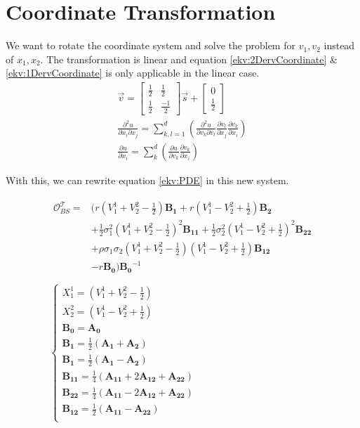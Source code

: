 \documentclass[a4paper]{article}      %
\begin{document}
\section*{Coordinate Transformation}
We want to rotate the coordinate system and solve the problem for $v_1, v_2$ instead of  $x_1, x_2$. The transformation is linear and equation \ref{ekv:2DervCoordinate} \& \ref{ekv:1DervCoordinate} is only applicable in the linear case. 
\begin{gather}
\vec{v} =
\begin{bmatrix}
\frac{1}{2} & \frac{1}{2} \\ \frac{1}{2} & \frac{-1}{2}
\end{bmatrix}
\vec{s} +
\begin{bmatrix}
0 \\ \frac{1}{2}
\end{bmatrix} \\
\frac{\partial^2 u}{\partial {x_i}\partial {x_j}} =
\sum_{k,l = 1}^d 
\left( 
\frac{\partial^2 u}{\partial {v_k}\partial {v_l}}
\frac{\partial v_l}{\partial {x_j}}
\frac{\partial v_k}{\partial {x_i}}
\right) \label{ekv:2DervCoordinate}\\
\frac{\partial u}{\partial x_i}
= \sum_k^d
\left(
\frac{\partial u}{\partial v_k}
\frac{\partial v_k}{\partial x_i}
\right) \label{ekv:1DervCoordinate}
\end{gather}

With this, we can rewrite equation \ref{ekv:PDE} in this new system.

\begin{gather}
\begin{aligned}
 \mathcal{O}_{BS}^\mathcal{T} =& \Big( r(V_1^1 + V_2^2 - \frac{1}{2}) \mathbf{B_1} + r(V_1^1 - V_2^2 + \frac{1}{2}) \mathbf{B_2} \\
&+ \frac{1}{2} \sigma_1^2 (V_1^1 + V_2^2 - \frac{1}{2})^2 \mathbf{B_{11}} 
+ \frac{1}{2} \sigma_2^2 (V_1^1 - V_2^2 + \frac{1}{2})^2 \mathbf{B_{22}} \\
&+ \rho \sigma_1 \sigma_2 (V_1^1 + V_2^2 - \frac{1}{2}) (V_1^1 - V_2^2 + \frac{1}{2}) \mathbf{B_{12}} \\
& - r\mathbf{B_0} \Big) \mathbf{B_0}^{-1} \\
\end{aligned}
\\
\begin{cases}
X_1^1 = (V_1^1 + V_2^2 - \frac{1}{2}) \\
X_2^2 = (V_1^1 - V_2^2 + \frac{1}{2}) \\
\mathbf{B_0} = \mathbf{A_0} \\
\mathbf{B_1} = \frac{1}{2}(\mathbf{A_1} + \mathbf{A_2}) \\
\mathbf{B_1} = \frac{1}{2}(\mathbf{A_1} - \mathbf{A_2}) \\
\mathbf{B_{11}} = \frac{1}{4}(\mathbf{A_{11}} + 2\mathbf{A_{12}} + \mathbf{A_{22}}) \\
\mathbf{B_{22}} = \frac{1}{4}(\mathbf{A_{11}} - 2\mathbf{A_{12}} + \mathbf{A_{22}}) \\
\mathbf{B_{12}} = \frac{1}{2}(\mathbf{A_{11}} - \mathbf{A_{22}}) \\
\end{cases}
\end{gather}
\end{document}

